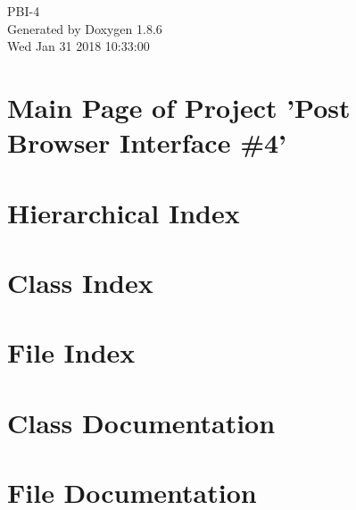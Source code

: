 \documentclass[twoside]{book}
\newcommand{\clearemptydoublepage}{%
  \newpage{\pagestyle{empty}\cleardoublepage}%
}
\begin{document}
\hypersetup{pageanchor=false}
\begin{titlepage}
\vspace*{7cm}
\begin{center}%
{\Large P\-B\-I-\/4 }\\
\vspace*{1cm}
{\large Generated by Doxygen 1.8.6}\\
\vspace*{0.5cm}
{\small Wed Jan 31 2018 10:33:00}\\
\end{center}
\end{titlepage}
\clearemptydoublepage
\tableofcontents
\clearemptydoublepage
{}
\hypersetup{pageanchor=true}

\chapter{Main Page of Project 'Post Browser Interface \#4'}
\label{index}\hypertarget{index}{}
\chapter{Hierarchical Index}

\chapter{Class Index}

\chapter{File Index}

\chapter{Class Documentation}

















\chapter{File Documentation}






































\newpage
{}
{}
\printindex
\end{document}
